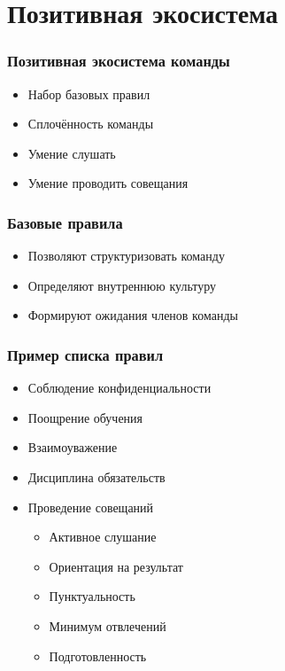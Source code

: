 \documentclass{../../slides-style}
\begin{document}
    \section{Позитивная экосистема}

    \begin{frame}
        \frametitle{Позитивная экосистема команды}
        \begin{itemize}
            \item Набор базовых правил 
            \item Сплочённость команды
            \item Умение слушать
            \item Умение проводить совещания
        \end{itemize}
    \end{frame}

    \begin{frame}
        \frametitle{Базовые правила}
        \begin{itemize}
            \item Позволяют структуризовать команду
            \item Определяют внутреннюю культуру
            \item Формируют ожидания членов команды
        \end{itemize}
    \end{frame}

    \begin{frame}
        \frametitle{Пример списка правил}
        \begin{itemize}
            \item Соблюдение конфиденциальности
            \item Поощрение обучения
            \item Взаимоуважение
            \item Дисциплина обязательств
            \item Проведение совещаний
            \begin{itemize}
                \item Активное слушание
                \item Ориентация на результат
                \item Пунктуальность
                \item Минимум отвлечений
                \item Подготовленность
            \end{itemize}
        \end{itemize}
    \end{frame}
\end{document}
